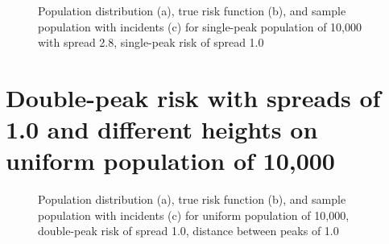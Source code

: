 {\begin{table}[H]
    
    \caption[]{Error rates for single-peak population of 10,000 with \gls{spread} 2.8, single-peak risk of \gls{spread} 1.0}
    \label{tab:mean_error_rates:p2.8_100_1.0_1h}
\end{table}

\begin{figure}[H]
    
    \caption[]{Population distribution (a), true risk function (b), and sample population with incidents (c) for single-peak population of 10,000 with \gls{spread} 2.8, single-peak risk of \gls{spread} 1.0}
    \label{fig:distributions:p2.8_100_1.0_1h}    
\end{figure} \newpage





\section[Double-peak risk with spreads of 1.0 and different heights]
    {Double-peak risk with spreads of 1.0 and different heights on uniform population of 10,000}
\label{sec:app:results_unif_100_1_2h_X}


\begin{table}[H]
    
    \caption[]{Error rates for uniform population of 10,000, double-peak risk with \glspl{spread} 1.0, distance between peaks of 1.0}
    \label{tab:mean_error_rates:unif_100_1_2h_1}
\end{table}

\begin{figure}[H]
    
    \caption[]{Population distribution (a), true risk function (b), and sample population with incidents (c) for uniform population of 10,000, double-peak risk of \gls{spread} 1.0, distance between peaks of 1.0}
    \label{fig:distributions:unif_100_1_2h_1}    
\end{figure} \newpage


}
